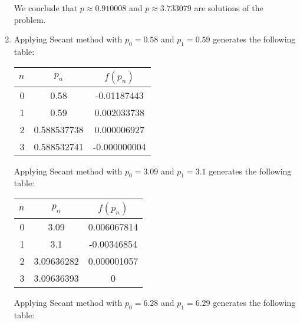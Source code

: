 \documentclass[../../../../Assignments]{subfiles}
\begin{document}
\begin{solution}
\begin{enumerate}[label = \alph*)]
            We conclude that \(p \approx \num{0.910008}\) and \(p \approx
            \num{3.733079}\) are solutions of the problem.

        \item Applying Secant method with \(p_0 = \num{0.58}\) and \(p_1 =
            \num{0.59}\) generates the following table:

            \begin{table}[H]
                \centering
                \begin{tabular}{r S[table-format=1.9] S[table-format=-1.9]}
                    \toprule
                    \(n\)  &   {\(p_n\)}   &  {\(f(p_n)\)}  \\
                      &  0.58         &  -0.01187443   \\
                        1  &  0.59         &   0.002033738  \\
                        2  &  0.588537738  &   0.000006927  \\
                        3  &  0.588532741  &  -0.000000004  \\
                    \bottomrule
                \end{tabular}
            \end{table}

            Applying Secant method with \(p_0 = \num{3.09}\) and \(p_1 =
            \num{3.1}\) generates the following table:

            \begin{table}[H]
                \centering
                \begin{tabular}{r S[table-format=1.8] S[table-format=-1.9]}
                    \toprule
                    \(n\)  &   {\(p_n\)}   &  {\(f(p_n)\)}  \\
                      &  3.09         &   0.006067814  \\
                        1  &  3.1          &  -0.00346854   \\
                        2  &  3.09636282   &   0.000001057  \\
                        3  &  3.09636393   &   0            \\
                    \bottomrule
                \end{tabular}
            \end{table}

            Applying Secant method with \(p_0 = \num{6.28}\) and \(p_1 =
            \num{6.29}\) generates the following table:


\end{enumerate}
\end{solution}
\end{document}
